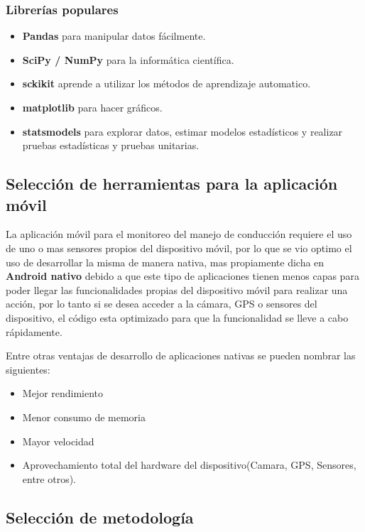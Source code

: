 \subsubsection{Librerías populares}
\begin{itemize}

\item \textbf{Pandas} para manipular datos fácilmente.

\item \textbf{SciPy / NumPy} para la informática científica.

\item \textbf{sckikit} aprende a utilizar los métodos de aprendizaje automatico.

\item \textbf{matplotlib} para hacer gráficos.

\item \textbf{statsmodels} para explorar datos, estimar modelos estadísticos y realizar pruebas estadísticas y pruebas unitarias.
\end{itemize}
\subsection{Selección de herramientas para la aplicación móvil}
La aplicación móvil para el monitoreo del manejo de conducción requiere el uso de uno o mas sensores propios del dispositivo móvil, por lo que se vio optimo el uso de desarrollar la misma de manera nativa, mas propiamente dicha en \textbf{Android nativo} debido a que este tipo de aplicaciones tienen menos capas para poder llegar las funcionalidades propias del dispositivo móvil para realizar una acción, por lo tanto si se desea acceder a la cámara, GPS o sensores del dispositivo, el código esta optimizado para que la funcionalidad se lleve a cabo rápidamente.

Entre otras ventajas de desarrollo de aplicaciones nativas se pueden nombrar las siguientes:
\begin{itemize}
\item Mejor rendimiento
\item Menor consumo de memoria
\item Mayor velocidad
\item Aprovechamiento total del hardware del dispositivo(Camara, GPS, Sensores, entre otros).
\end{itemize}

\subsection{Selección de metodología}
